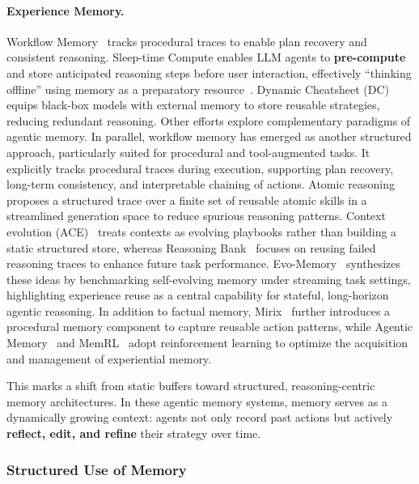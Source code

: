 \paragraph{Experience Memory.} Workflow Memory~\cite{Wang2024AgentWM} tracks procedural traces to enable plan recovery and consistent reasoning. Sleep‑time Compute enables LLM agents to \textbf{pre-compute} and store anticipated reasoning steps before user interaction, effectively “thinking offline” using memory as a preparatory resource~\cite{Lin2025SleeptimeCB}. Dynamic Cheatsheet (DC)~\cite{suzgun2025dynamic} equips black-box models with external memory to store reusable strategies, reducing redundant reasoning. Other efforts explore complementary paradigms of agentic memory. In parallel, workflow memory has emerged as another structured approach, particularly suited for procedural and tool-augmented tasks. It explicitly tracks procedural traces during execution, supporting plan recovery, long-term consistency, and interpretable chaining of actions. Atomic reasoning~\cite{zhang2025atomic} proposes a structured trace over 
a finite set of reusable atomic skills in a streamlined generation space to reduce spurious reasoning patterns. Context evolution (ACE)~\cite{zhang2025agentic} treats contexts as evolving playbooks rather than building a static structured store, whereas Reasoning Bank~\cite{ouyang2025reasoningbank} focuses on reusing failed reasoning traces to enhance future task performance. Evo-Memory~\cite{wei2025evo} synthesizes these ideas by benchmarking self-evolving memory under streaming task settings, highlighting experience reuse as a central capability for stateful, long-horizon agentic reasoning. In addition to factual memory, Mirix~\cite{wang2025mirix} further introduces a procedural memory component to capture reusable action patterns, while Agentic Memory~\cite{yu2026agentic} and MemRL~\cite{zhang2026memrl} adopt reinforcement learning to optimize the acquisition and management of experiential memory.

This marks a shift from static buffers toward structured, reasoning-centric memory architectures. In these agentic memory systems, memory serves as a dynamically growing context: agents not only record past actions but actively \textbf{reflect, edit, and refine} their strategy over time.

\subsubsection{Structured Use of Memory}

